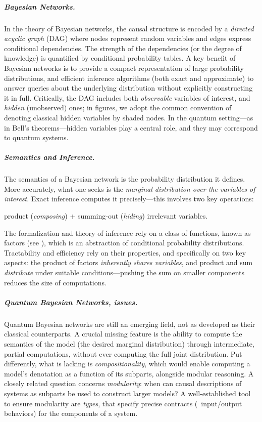 \subparagraph{Bayesian Networks.}

In the theory of Bayesian networks, the causal structure is encoded by a \emph{directed acyclic graph} (DAG) where nodes represent random variables and edges express conditional dependencies.
The strength of the dependencies (or the degree of knowledge) is quantified by conditional probability tables.
A key benefit of Bayesian networks is to provide a compact representation of large probability distributions, and efficient inference algorithms (both exact and approximate) to answer queries about the underlying distribution without explicitly constructing it in full.
Critically, the DAG includes both \emph{observable} variables of interest, and \emph{hidden} (unobserved) ones; in figures, we adopt the common convention of denoting classical hidden variables by shaded nodes. In the quantum setting---as in Bell's theorems---hidden variables play a central role, and they may correspond to quantum systems.

\subparagraph{Semantics and Inference.}

The semantics of a Bayesian network is the probability distribution it defines.
More accurately, what one seeks is the \emph{marginal distribution over the variables of interest}.
Exact inference computes it precisely---this involves two key operations:

{\hfill
	product (\emph{composing}) 
	+ summing-out (\emph{hiding}) irrelevant variables.
\hfill}

The formalization and theory of inference rely on a class of functions, known as factors (see ), which is an abstraction of conditional probability distributions.
Tractability and efficiency rely on their properties, and specifically on two key aspects: the product of factors \emph{inherently shares variables}, and product and sum \emph{distribute} under suitable conditions---pushing the sum on smaller components reduces the size of computations.

\subparagraph{Quantum Bayesian Networks, issues.}

Quantum Bayesian networks are still an emerging field, not as developed as their classical counterparts.
A crucial missing feature is the ability to compute the semantics of the model (the desired marginal distribution) through intermediate, partial computations, without ever computing the full joint distribution.
Put differently, what is lacking is \emph{compositionality}, which would enable computing a model's denotation as a function of its subparts, alongside modular reasoning.
A closely related question concerns \emph{modularity}: when can causal descriptions of systems as subparts be used to construct larger models?
A well-established tool to ensure modularity are \emph{types}, that specify precise contracts (\eg\ input/output behaviors) for the components of a system. 

